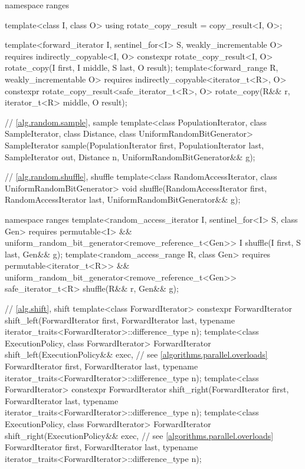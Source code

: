 \begin{codeblock}
{  namespace ranges {
    template<class I, class O>
    using rotate_copy_result = copy_result<I, O>;

    template<forward_iterator I, sentinel_for<I> S, weakly_incrementable O>
      requires indirectly_copyable<I, O>
      constexpr rotate_copy_result<I, O>
        rotate_copy(I first, I middle, S last, O result);
    template<forward_range R, weakly_incrementable O>
      requires indirectly_copyable<iterator_t<R>, O>
      constexpr rotate_copy_result<safe_iterator_t<R>, O>
        rotate_copy(R&& r, iterator_t<R> middle, O result);
  }

  // \ref{alg.random.sample}, sample
  template<class PopulationIterator, class SampleIterator,
           class Distance, class UniformRandomBitGenerator>
    SampleIterator sample(PopulationIterator first, PopulationIterator last,
                          SampleIterator out, Distance n,
                          UniformRandomBitGenerator&& g);

  // \ref{alg.random.shuffle}, shuffle
  template<class RandomAccessIterator, class UniformRandomBitGenerator>
    void shuffle(RandomAccessIterator first,
                 RandomAccessIterator last,
                 UniformRandomBitGenerator&& g);

  namespace ranges {
    template<random_access_iterator I, sentinel_for<I> S, class Gen>
      requires permutable<I> &&
               uniform_random_bit_generator<remove_reference_t<Gen>>
      I shuffle(I first, S last, Gen&& g);
    template<random_access_range R, class Gen>
      requires permutable<iterator_t<R>> &&
               uniform_random_bit_generator<remove_reference_t<Gen>>
      safe_iterator_t<R> shuffle(R&& r, Gen&& g);
  }

  // \ref{alg.shift}, shift
  template<class ForwardIterator>
    constexpr ForwardIterator
      shift_left(ForwardIterator first, ForwardIterator last,
                 typename iterator_traits<ForwardIterator>::difference_type n);
  template<class ExecutionPolicy, class ForwardIterator>
    ForwardIterator
      shift_left(ExecutionPolicy&& exec,                        // see \ref{algorithms.parallel.overloads}
                 ForwardIterator first, ForwardIterator last,
                 typename iterator_traits<ForwardIterator>::difference_type n);
  template<class ForwardIterator>
    constexpr ForwardIterator
      shift_right(ForwardIterator first, ForwardIterator last,
                  typename iterator_traits<ForwardIterator>::difference_type n);
  template<class ExecutionPolicy, class ForwardIterator>
    ForwardIterator
      shift_right(ExecutionPolicy&& exec,                       // see \ref{algorithms.parallel.overloads}
                  ForwardIterator first, ForwardIterator last,
                  typename iterator_traits<ForwardIterator>::difference_type n);

}
\end{codeblock}
